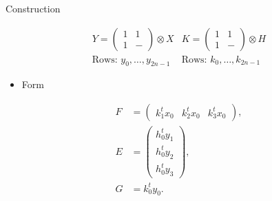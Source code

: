\documentclass{beamer}
\begin{document}
\begin{frame}{Construction}

  \[
    \begin{array}{cc}
      Y = \left( \begin{smallmatrix} 1&1\\1&- \end{smallmatrix} \right) \otimes X
                                           &
      K = \left( \begin{smallmatrix} 1&1\\1&- \end{smallmatrix} \right) \otimes H
      \\
      \text{Rows: } y_0, \dots, y_{2n-1}
                                      &
      \text{Rows: } k_0, \dots, k_{2n-1}
    \end{array}
  \]

  \begin{itemize}
    \item Form
  \end{itemize}

  \begin{align*}
    F &= \begin{pmatrix} k_1^tx_0 & k_2^tx_0 & k_3^tx_0 \end{pmatrix}, \\
    E &= \begin{pmatrix} h_0^ty_1 \\ h_0^ty_2 \\ h_0^ty_3 \end{pmatrix}, \\
    G &= k_0^ty_0.
  \end{align*}
  
\end{frame}
\end{document}
